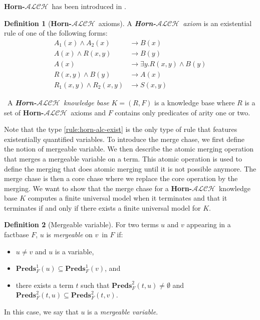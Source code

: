 \documentclass{article}
\theoremstyle{definition}
\newtheorem{definition}{Definition}[section]
\theoremstyle{remark}
\newcommand{\Preds}{\textbf{Preds}}
\newcommand{\ALCH}{\textbf{Horn-$\mathcal{ALCH}$}}
\begin{document}
\ALCH\ has been introduced in \cite{Horn-ALC}.

\begin{definition}[\ALCH\ axioms]
A \emph{\ALCH\ axiom} is an existential rule of one of the following forms:
\begin{align}
A_1(x) \wedge A_2(x) &\rightarrow B(x) \\
A(x) \wedge R(x,y) &\rightarrow B(y) \\
A(x) &\rightarrow \exists y.R(x,y) \wedge B(y) \label{rule:horn-alc-exist} \\
R(x,y) \wedge B(y) &\rightarrow A(x) \\
R_1(x,y) \wedge R_2(x,y) &\rightarrow S(x,y)
\end{align}


\
A \emph{\ALCH\ knowledge base} $K = (R,F)$ is a knowledge base where $R$ is a set of \ALCH\ axioms and $F$ contains only predicates of arity one or two. 

\end{definition}

Note that the type \ref{rule:horn-alc-exist} is the only type of rule that features existentially quantified variables. To introduce the merge chase, we first define the notion of mergeable variable. We then describe the atomic merging operation that merges a mergeable variable on a term. This atomic operation is used to define the merging that does atomic merging until it is not possible anymore. The merge chase is then a core chase where we replace the core operation by the merging. We want to show that the merge chase for a \ALCH\ knowledge base $K$ computes a finite universal model when it terminates and that it terminates if and only if there exists a finite universal model for $K$. 

\begin{definition}[Mergeable variable]
For two terms $u$ and $v$ appearing in a factbase $F$, $u$ is \emph{mergeable} on $v$\ in $F$ if:
\begin{itemize}
\item $u \neq v$ and $u$ is a variable,
\item $\Preds_{F}^1(u) \subseteq \Preds_{F}^1(v)$, and
\item there exists a term $t$ such that $\Preds^2_{F}(t,u) \neq \emptyset$ and $\Preds_{F}^2(t,u) \subseteq \Preds_{F}^2(t,v)$.
\end{itemize}
In this case, we say that $u$ is a \emph{mergeable variable}.
\end{definition}
\end{document}
